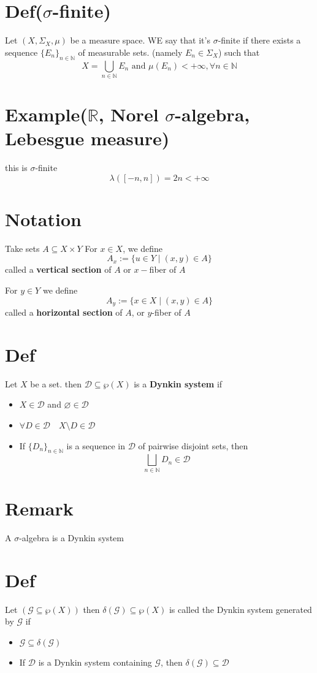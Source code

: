 \documentclass{book}
\begin{document}
\section{Def($\sigma$-finite)}
Let $(X,\Sigma_X,\mu)$ be a measure space. WE say that it's $\sigma$-finite if there exists a sequence $\{E_n\}_{n\in \mathbb{N}}$ of measurable sets. (namely $E_n\in \Sigma_X$) such that $$X=\bigcup\limits_{n\in \mathbb{N}}E_n\text{ and }\mu(E_n)<+\infty, \forall n\in \mathbb{N}$$
\section{Example($\mathbb{R}$, Norel $\sigma$-algebra, Lebesgue measure)}
this is $\sigma$-finite$$\lambda([-n,n])=2n<+\infty$$
\section{Notation}
Take sets $A\subseteq X\times Y$ For $x\in X$, we define
$$A_x:=\{u\in Y\mid(x,y)\in A\}$$
called a \textbf{vertical section} of $A$ or $x-$fiber of $A$

For $y\in Y$ we define
$$A_y:=\{x\in X\mid(x,y)\in A\}$$
called a \textbf{horizontal section} of $A$, or $y$-fiber of $A$
\section{Def}
Let $X$ be a set. then $\mathscr{D}\subseteq\wp(X)$ is a \textbf{Dynkin system} if 
\begin{itemize}
    \item $X\in \mathscr{D}$ and $\varnothing\in \mathscr{D}$
    \item $\forall D\in \mathscr{D}\quad X\setminus D\in \mathscr{D}$
    \item If $\{D_n\}_{n\in \mathbb{N}}$ is a sequence in $\mathscr{D}$ of pairwise disjoint sets, then $$\bigsqcup\limits_{n\in \mathbb{N}}D_n\in \mathscr{D}$$
\end{itemize}
\section*{Remark}
A $\sigma$-algebra is a Dynkin system
\section{Def}
Let $(\mathcal{G}\subseteq\wp(X))$ then $\delta(\mathcal{G})\subseteq\wp(X)$ is called the Dynkin system generated by $\mathcal{G}$ if \begin{itemize}
    \item $\mathcal{G}\subseteq\delta(\mathcal{G})$
    \item If $\mathscr{D}$ is a Dynkin system containing $\mathcal{G}$, then $\delta(\mathcal{G})\subseteq\mathscr{D}$
\end{itemize}
\end{document}

